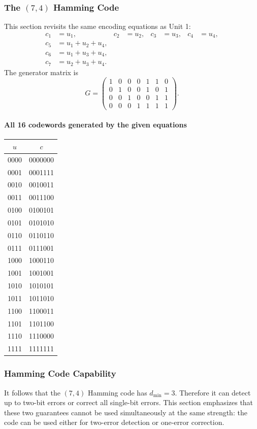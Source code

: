 \documentclass[12pt]{article}
\begin{document}
\subsubsection{The $(7,4)$ Hamming Code}
This section revisits the same encoding equations as Unit 1:
\[
\begin{aligned}
 c_1&=u_1,&c_2&=u_2,&c_3&=u_3,&c_4&=u_4,\\
 c_5&=u_1+u_2+u_4,\\
 c_6&=u_1+u_3+u_4,\\
 c_7&=u_2+u_3+u_4.
\end{aligned}
\]
The generator matrix is
\[
G=
\begin{pmatrix}
1&0&0&0&1&1&0\\
0&1&0&0&1&0&1\\
0&0&1&0&0&1&1\\
0&0&0&1&1&1&1
\end{pmatrix}.
\]

\paragraph{All 16 codewords generated by the given equations}
\begin{center}
\scriptsize
\begin{tabular}{cc}
\toprule
$u$ & $c$\\
\midrule
0000 & 0000000\\
0001 & 0001111\\
0010 & 0010011\\
0011 & 0011100\\
0100 & 0100101\\
0101 & 0101010\\
0110 & 0110110\\
0111 & 0111001\\
1000 & 1000110\\
1001 & 1001001\\
1010 & 1010101\\
1011 & 1011010\\
1100 & 1100011\\
1101 & 1101100\\
1110 & 1110000\\
1111 & 1111111\\
\bottomrule
\end{tabular}
\end{center}

\subsubsection{Hamming Code Capability}
It follows that the $(7,4)$ Hamming code has $d_{\min}=3$. Therefore it can detect up to two-bit errors or correct all single-bit errors. This section emphasizes that these two guarantees cannot be used simultaneously at the same strength: the code can be used either for two-error detection or one-error correction.
\end{document}
